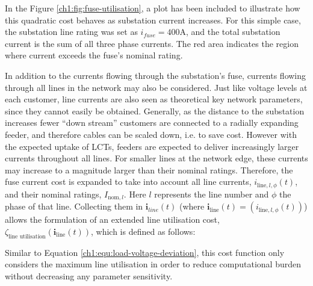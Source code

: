 

In the Figure \ref{ch1:fig:fuse-utilisation}, a plot has been included to illustrate how this quadratic cost behaves as substation current increases.
For this simple case, the substation line rating was set as $i_{fuse}=400\text{A}$, and the total substation current is the sum of all three phase currents.
The red area indicates the region where current exceeds the fuse's nominal rating.




In addition to the currents flowing through the substation's fuse, currents flowing through all lines in the network may also be considered.
Just like voltage levels at each customer, line currents are also seen as theoretical key network parameters, since they cannot easily be obtained.
Generally, as the distance to the substation increases fewer ``down stream'' customers are connected to a radially expanding feeder, and therefore cables can be scaled down, i.e. to save cost.
However with the expected uptake of LCTs, feeders are expected to deliver increasingly larger currents throughout all lines.
For smaller lines at the network edge, these currents may increase to a magnitude larger than their nominal ratings.
Therefore, the fuse current cost is expanded to take into account all line currents, $i_{\text{line},l,\phi}(t)$, and their nominal ratings, $I_{\text{nom}, l}$.
Here $l$ represents the line number and $\phi$ the phase of that line.
Collecting them in $\textbf{i}_{line}(t)$ (where $\textbf{i}_\text{line}(t) = (i_{\text{line},l,\phi}(t))$) allows the formulation of an extended line utilisation cost, $\zeta_\text{line utilisation}(\textbf{i}_\text{line}(t))$, which is defined as follows:



Similar to Equation \ref{ch1:equ:load-voltage-deviation}, this cost function only considers the maximum line utilisation in order to reduce computational burden without decreasing any parameter sensitivity.
